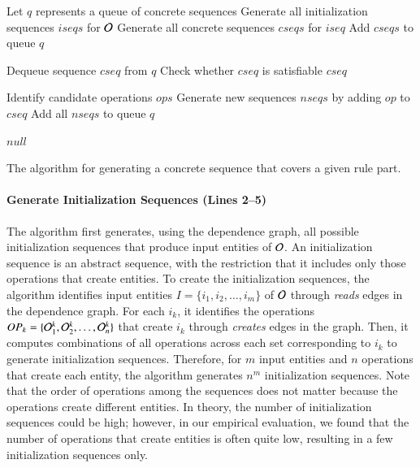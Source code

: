 \begin{algorithm}[t]
\small
\SetAlgoVlined
{}
\BlankLine

\nl Let $q$ represents a queue of concrete sequences\;
\nl Generate all initialization sequences $iseqs$ for ${\cal O}$\;
\nl {}
{
		\nl Generate all concrete sequences $cseqs$ for $iseq$\;
		\nl Add $cseqs$ to queue $q$\;
} 

\nl {}
{
		\nl Dequeue sequence $cseq$ from $q$\;
		\nl Check whether $cseq$ is satisfiable\;
		\nl {}
		{
				\Return $cseq$\;
		}
		
		\nl Identify candidate operations $ops$\;		
		\nl {}
		{
			\nl Generate new sequences $nseqs$ by adding $op$ to $cseq$\;
			\nl Add all $nseqs$ to queue $q$\;
		}
}

\Return $null$\;
		
\caption{\label{alg:guidedsearch} The algorithm for
  generating a concrete sequence that covers a given rule part.}
\end{algorithm}

\vskip -7pt
\paragraph*{Generate Initialization Sequences (Lines 2--5)} The algorithm first
generates, using the dependence graph, all possible initialization sequences
that produce input entities of ${\cal O}$. An initialization sequence is an
abstract sequence, with the restriction that it includes only those operations
that create entities. To create the initialization sequences, the algorithm
identifies input entities $I = \{i_1, i_2, \ldots, i_m\}$ of ${\cal O}$ through
\textit{reads} edges in the dependence graph. For each $i_k$, it identifies the
operations $OP_k = \{{\cal O}^k_1, {\cal O}^k_2, \ldots, {\cal O}^k_n\}$ that
create $i_k$ through \textit{creates} edges in the graph.
Then, it computes combinations of all operations across each set corresponding
to $i_k$ to generate initialization sequences. Therefore, for $m$ input entities
and $n$ operations that create each entity, the algorithm generates $n^m$
initialization sequences. Note that the order of operations among the sequences
does not matter because the operations create different entities.  In theory,
the number of initialization sequences could be high; however, in our empirical
evaluation, we found that the number of operations that create entities is often
quite low, resulting in a few initialization sequences only.

